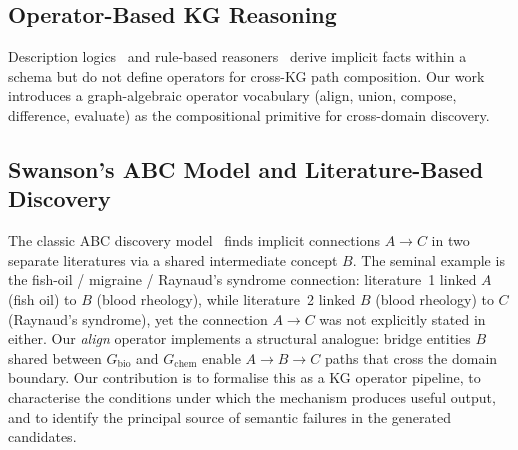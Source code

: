 \subsection{Operator-Based KG Reasoning}

Description logics~\cite{TODO-description-logics} and rule-based
reasoners~\cite{TODO-rule-reasoning} derive implicit facts within a schema but
do not define operators for cross-KG path composition.
Our work introduces a graph-algebraic operator vocabulary (align, union, compose,
difference, evaluate) as the compositional primitive for cross-domain discovery.

\subsection{Swanson's ABC Model and Literature-Based Discovery}

The classic ABC discovery model~\cite{swanson1986fish} finds implicit connections
$A \to C$ in two separate literatures via a shared intermediate concept $B$.
The seminal example is the fish-oil / migraine / Raynaud's syndrome connection:
literature~1 linked $A$ (fish oil) to $B$ (blood rheology), while literature~2
linked $B$ (blood rheology) to $C$ (Raynaud's syndrome), yet the connection
$A \to C$ was not explicitly stated in either.
Our \textit{align} operator implements a structural analogue: bridge entities $B$
shared between $G_{\text{bio}}$ and $G_{\text{chem}}$ enable $A \to B \to C$
paths that cross the domain boundary.
Our contribution is to formalise this as a KG operator pipeline, to characterise
the conditions under which the mechanism produces useful output, and to identify
the principal source of semantic failures in the generated candidates.
